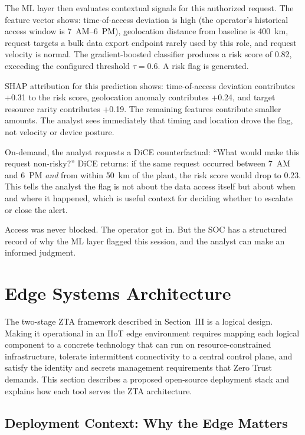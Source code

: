 \documentclass[conference]{IEEEtran}
\begin{document}
The ML layer then evaluates contextual signals for this authorized request. The feature vector shows: time-of-access deviation is high (the operator's historical access window is 7~AM--6~PM), geolocation distance from baseline is 400~km, request targets a bulk data export endpoint rarely used by this role, and request velocity is normal. The gradient-boosted classifier produces a risk score of 0.82, exceeding the configured threshold $\tau = 0.6$. A risk flag is generated.

SHAP attribution for this prediction shows: time-of-access deviation contributes +0.31 to the risk score, geolocation anomaly contributes +0.24, and target resource rarity contributes +0.19. The remaining features contribute smaller amounts. The analyst sees immediately that timing and location drove the flag, not velocity or device posture.

On-demand, the analyst requests a DiCE counterfactual: ``What would make this request non-risky?'' DiCE returns: if the same request occurred between 7~AM and 6~PM \textit{and} from within 50~km of the plant, the risk score would drop to 0.23. This tells the analyst the flag is not about the data access itself but about when and where it happened, which is useful context for deciding whether to escalate or close the alert.

Access was never blocked. The operator got in. But the SOC has a structured record of why the ML layer flagged this session, and the analyst can make an informed judgment.

\section{Edge Systems Architecture}

The two-stage ZTA framework described in Section~III is a logical design. Making it operational in an IIoT edge environment requires mapping each logical component to a concrete technology that can run on resource-constrained infrastructure, tolerate intermittent connectivity to a central control plane, and satisfy the identity and secrets management requirements that Zero Trust demands. This section describes a proposed open-source deployment stack and explains how each tool serves the ZTA architecture.

\subsection{Deployment Context: Why the Edge Matters}
\end{document}
